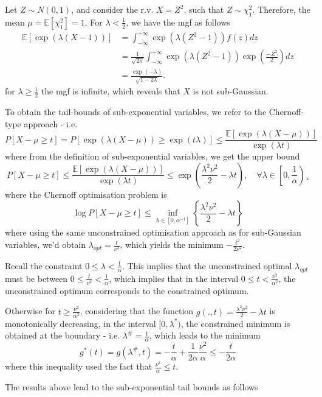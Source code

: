 \documentclass[10pt,handout,english]{beamer}
\newcommand{\E}{\mathbb{E}}
\begin{document}
\begin{frame}
\begin{example}
Let $Z\sim N(0,1)$, and consider the r.v. $X=Z^2$, such that $Z\sim \chi^2_1$. Therefore, the mean $\mu=\E[\chi_1^2]=1$. For $\lambda<\frac{1}{2}$, we have the mgf as follows
\begin{align*}
\E[\exp(\lambda(X-1))]&=\int_{-\infty}^{+\infty}\exp(\lambda(Z^2-1))f(z)dz\\
&=\frac{1}{\sqrt{2\pi}}\int_{-\infty}^{+\infty}\exp(\lambda(Z^2-1))\exp\left(\frac{-Z^2}{2}\right)dz\\
&=\frac{\exp(-\lambda)}{\sqrt{1-2\lambda}}.
\end{align*}
for $\lambda\geq\frac{1}{2}$ the mgf is infinite, which reveals that $X$ is not sub-Gaussian.
\end{example}
\end{frame}
\begin{frame}[allowframebreaks]
To obtain the tail-bounds of sub-exponential variables, we refer to the Chernoff-type approach - i.e.  
\[
P[X-\mu\geq t]=P[\exp(\lambda(X-\mu))\geq\exp(t\lambda)]\leq\frac{\E[\exp(\lambda(X-\mu))]}{\exp(\lambda t)}
\]
where from the definition of sub-exponential variables, we get the upper bound
\[
P[X-\mu\geq t]\leq\frac{\E[\exp(\lambda(X-\mu))]}{\exp(\lambda t)}\leq\exp\left(\frac{\lambda^2\nu^2}{2}-\lambda t\right),\quad\forall \lambda\in\left[0,\frac{1}{\alpha}\right)¸
\]
where the Chernoff optimisation problem is
\[
\log P[X-\mu\geq t]\leq \inf_{\lambda\in[0,\alpha^{-1}]}\left\{\frac{\lambda^2\nu^2}{2}-\lambda t\right\}
\]
where using the same unconstrained optimisation approach as for sub-Gaussian variables, we'd obtain $\lambda_{opt}=\frac{t}{\nu^2}$, which yields the minimum $-\frac{t^2}{2\nu^2}$.

Recall the constraint $0\leq\lambda<\frac{1}{\alpha}$. This implies that the unconstrained optimal $\lambda_{opt}$ must be between $0\leq\frac{t}{\nu^2}<\frac{1}{\alpha}$, which implies that in the interval $0\leq t<\frac{\nu^2}{\alpha^2}$, the unconstrained optimum corresponds to the constrained optimum.

Otherwise for $t\geq \frac{\nu^2}{\alpha^2}$, considering that the function $g(.,t)=\frac{\lambda^2\nu^2}{2}-\lambda t$ is monotonically decreasing, in the interval $[0,\lambda^*)$, the constrained minimum is obtained at the boundary - i.e. $\lambda^\#=\frac{1}{\alpha}$, which leads to the minimum
\[
g^*(t)=g(\lambda^\#,t)=-\frac{t}{\alpha}+\frac{1}{2\alpha}\frac{\nu^2}{\alpha}\leq- \frac{t}{2\alpha}
\]
where this inequality used the fact that $\frac{\nu^2}{\alpha}\leq t$.

The results above lead to the sub-exponential tail bounds as follows
\end{frame}
\end{document}
